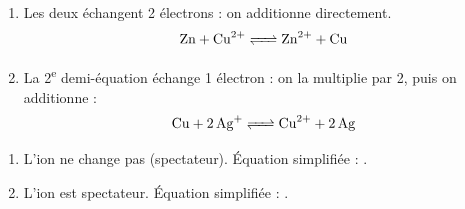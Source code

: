 \documentclass[11pt,a4paper]{article}
\begin{document}
\begin{corrige}
\begin{enumerate}[label=\alph*)]
  \item Les deux échangent 2 électrons : on additionne directement.
        \[\ce{Zn + Cu^{2+} <=> Zn^{2+} + Cu}\]
  \item La 2\textsuperscript{e} demi-équation échange 1 électron : on la multiplie par 2, puis on
        additionne :
        \[\ce{Cu + 2 Ag+ <=> Cu^{2+} + 2 Ag}\]
\end{enumerate}
\end{corrige}

\begin{corrige}
\begin{enumerate}[label=\alph*)]
  \item L'ion  ne change pas (spectateur). Équation simplifiée :
        .
  \item L'ion  est spectateur. Équation simplifiée :
        .
\end{enumerate}
\end{corrige}
\end{document}

